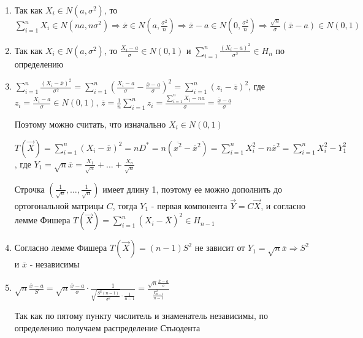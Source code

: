 \documentclass[12pt]{article}
\begin{document}
\begin{MyProof}
    \begin{enumerate}
        \item Так как $X_i \in N(a, \sigma^2)$, то $\sum_{i = 1}^n X_i \in N(na, n\sigma^2) \Longrightarrow \overline{x} \in N\left(a, \frac{\sigma^2}{n}\right) \Longrightarrow
        \overline{x} - a \in N\left(0, \frac{\sigma^2}{n}\right) \Longrightarrow \frac{\sqrt{n}}{\sigma} (\overline{x} - a) \in N(0, 1)$

        \item Так как $X_i \in N(a, \sigma^2)$, то $\frac{X_i - a}{\sigma} \in N(0, 1)$ и $\sum_{i = 1}^n \frac{(X_i - a)^2}{\sigma^2} \in H_n$ по определению
        
        \item $\sum_{i = 1}^n \frac{(X_i - \overline{x})^2}{\sigma^2} = \sum_{i = 1}^n \left(\frac{X_i - a}{\sigma} - \frac{\overline{x} - a}{\sigma}\right)^2 = 
        \sum_{i = 1}^n (z_i - \overline{z})^2$, где $z_i = \frac{X_i - a}{\sigma} \in N(0, 1)$, $\overline{z} = \frac{1}{n} \sum_{i = 1}^n z_i = \frac{\sum_{i = 1}^n X_i - na}{\sigma} = \frac{\overline{x} - a}{\sigma}$

        Поэтому можно считать, что изначально $X_i \in N(0, 1)$

        $T(\vec X) = \sum_{i = 1}^n \left(X_i - \overline{x}\right)^2 = n D^* = n (\overline{x^2} - \overline{x}^2) = \sum_{i = 1}^n X_i^2 - n\overline{x}^2 = \sum_{i = 1}^n X_i^2 - Y_1^2$, где $Y_1 = \sqrt{n} \overline{x} = \frac{X_1}{\sqrt{n}} + \dots + \frac{X_n}{\sqrt{n}}$

        Строчка $\left(\frac{1}{\sqrt{n}}, \dots, \frac{1}{\sqrt{n}}\right)$ имеет длину 1, поэтому ее можно дополнить до ортогональной матрицы $C$, тогда $Y_1$ - первая компонента $\vec Y = C \vec X$, 
        и согласно лемме Фишера $T(\vec X) = \sum_{i = 1}^n (X_i - \overline{X})^2 \in H_{n - 1}$

        
        \setcounter{enumi}{4}
        \item Согласно лемме Фишера $T(\vec X) = (n - 1) S^2$ не зависит от $Y_1 = \sqrt{n} \overline{x} \Longrightarrow S^2 $ и $\overline{x}$ - независимы
          
        \setcounter{enumi}{3}
        \item $\sqrt{n} \frac{\overline{x} - a}{S} = \sqrt{n} \frac{\overline{x} - a}{\sigma} \cdot \frac{1}{\sqrt{\frac{S^2 (n - 1)}{\sigma^2}} \cdot \frac{1}{n - 1}} = \frac{\sqrt{n} \frac{\overline{x} - a}{\sigma}}{\frac{\chi^2_{n - 1}}{n - 1}}$

        Так как по пятому пункту числитель и знаменатель независимы, по определению получаем распределение Стьюдента
    \end{enumerate}
\end{MyProof}
\end{document}
